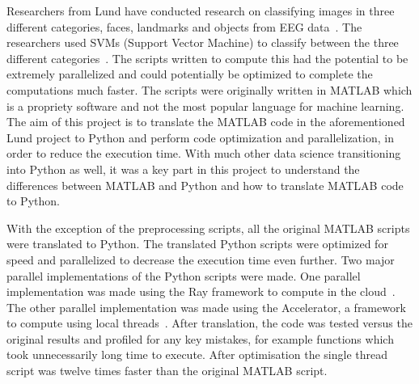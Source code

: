 \documentclass[12pt, a4paper]{article}
\begin{document}
Researchers from Lund have conducted research on classifying images in three different categories, faces, landmarks and objects from EEG data~\cite{BramoENEURO.0251-18.2018}.
The researchers used SVMs (Support Vector Machine) to classify between the three different categories~\cite{wiki:SVM,Cortes1995}.
The scripts written to compute this had the potential to be extremely parallelized and could potentially be optimized to complete the computations much faster.
The scripts were originally written in MATLAB which is a propriety software and not the most popular language for machine learning.
The aim of this project is to translate the MATLAB code in the aforementioned Lund project to Python and perform code optimization and parallelization, in order to reduce the execution time.
With much other data science transitioning into Python as well, it was a key part in this project to understand the differences between MATLAB and Python and how to translate MATLAB code to Python.\par

With the exception of the preprocessing scripts, all the original MATLAB scripts were translated to Python.
The translated Python scripts were optimized for speed and parallelized to decrease the execution time even further.
Two major parallel implementations of the Python scripts were made.
One parallel implementation was made using the Ray framework to compute in the cloud~\cite{ray:whatIsRay}.
The other parallel implementation was made using the Accelerator, a framework to compute using local threads~\cite{exax:Accelerator}.
After translation, the code was tested versus the original results and profiled for any key mistakes, for example functions which took unnecessarily long time to execute.
After optimisation the single thread script was twelve times faster than the original MATLAB script.
\end{document}
